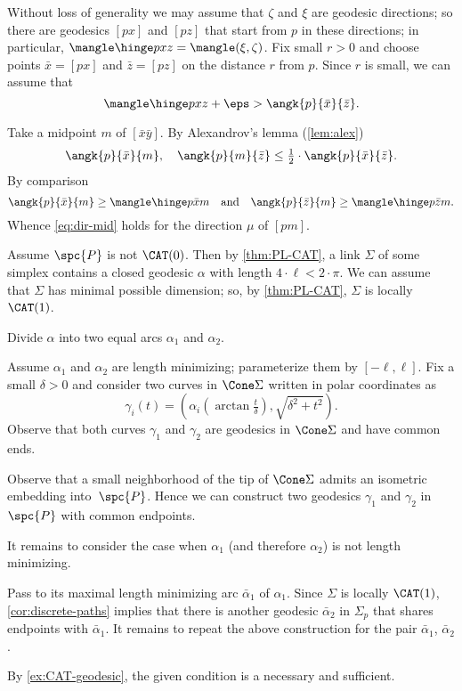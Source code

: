 Without loss of generality we may assume that $\zeta$ and $\xi$ are geodesic directions;
so there are geodesics $[px]$ and $[pz]$ that start from $p$ in these directions; in particular, $\mangle\hinge pxz=\mangle(\xi,\zeta)$.
Fix small $r>0$ and choose points $\bar x=[px]$ and $\bar z=[pz]$ on the distance $r$ from $p$.
Since $r$ is small, we can assume that 
\[\mangle\hinge pxz+\eps>\angk{p}{\bar x}{\bar z}.\]

Take a midpoint $m$ of $[\bar x\bar y]$.
By Alexandrov's lemma (\ref{lem:alex})
\[\angk{p}{\bar x}{m},\quad \angk{p}{m}{\bar z}\le \tfrac12\cdot \angk{p}{\bar x}{\bar z}.\]
By comparison
\[\angk{p}{\bar x}{m}\ge \mangle\hinge p{\bar x}{m}
\quad\text{and}\quad
\angk{p}{\bar z}{m}\ge \mangle\hinge p{\bar z}{m}.
\]
Whence \ref{eq:dir-mid} holds for the direction $\mu$ of $[pm]$.

Assume $\spc{P}$ is not $\CAT(0)$.
Then by \ref{thm:PL-CAT}, a link $\Sigma$ of some simplex contains a closed geodesic $\alpha$ with length $4\cdot\ell<2\cdot\pi$.
We can assume that $\Sigma$ has minimal possible dimension;
so, by \ref{thm:PL-CAT}, $\Sigma$ is locally $\CAT(1)$.

Divide $\alpha$ into two equal arcs $\alpha_1$ and $\alpha_2$.

Assume $\alpha_1$ and $\alpha_2$ are length minimizing;
parameterize them by $[-\ell,\ell]$.
Fix a small $\delta>0$ and 
consider two curves in $\Cone\Sigma$ written in polar coordinates as 
\[\gamma_i(t)=(\alpha_i(\arctan \tfrac t\delta),\sqrt{\delta^2+t^2}).\]
Observe that both curves $\gamma_1$ and $\gamma_2$ are geodesics in $\Cone\Sigma$ and  have common ends.

Observe that a small neighborhood of the tip of $\Cone\Sigma$ admits an isometric embedding into~$\spc{P}$.
Hence we can construct two geodesics $\gamma_1$ and $\gamma_2$ in $\spc{P}$ with common endpoints.

It remains to consider the case when $\alpha_1$ (and therefore $\alpha_2$) is not length minimizing.

Pass to its maximal length minimizing arc $\bar\alpha_1$ of $\alpha_1$.
Since $\Sigma$ is locally $\CAT(1)$, \ref{cor:discrete-paths} implies that 
there is another geodesic $\bar\alpha_2$ in $\Sigma_p$ that shares endpoints with $\bar\alpha_1$.
It remains to repeat the above construction for the pair $\bar\alpha_1$, $\bar\alpha_2$.


By \ref{ex:CAT-geodesic}, the given condition is a necessary and sufficient.

